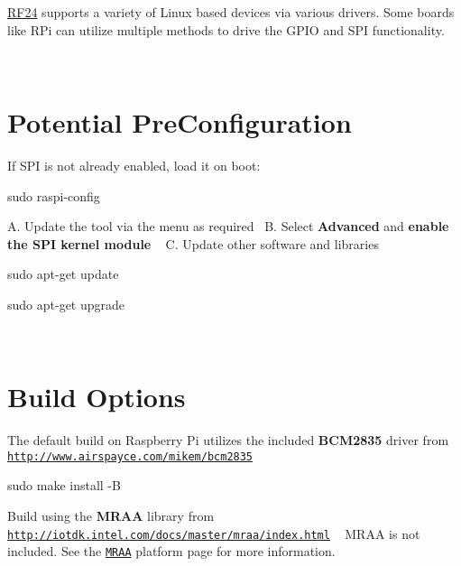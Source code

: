 \hyperlink{classRF24}{R\+F24} supports a variety of Linux based devices via various drivers. Some boards like R\+Pi can utilize multiple methods to drive the G\+P\+IO and S\+PI functionality.

~\newline
 \hypertarget{RPi_PreConfig}{}\section{Potential Pre\+Configuration}\label{RPi_PreConfig}
If S\+PI is not already enabled, load it on boot\+: 
\begin{DoxyCode}
sudo raspi-config  
\end{DoxyCode}
 A. Update the tool via the menu as required~\newline
 B. Select {\bfseries Advanced} and {\bfseries enable the S\+PI kernel module} ~\newline
 C. Update other software and libraries 
\begin{DoxyCode}
sudo apt-\textcolor{keyword}{get} update 
\end{DoxyCode}
 
\begin{DoxyCode}
sudo apt-\textcolor{keyword}{get} upgrade 
\end{DoxyCode}
 ~\newline
~\newline
\hypertarget{RPi_Build}{}\section{Build Options}\label{RPi_Build}
The default build on Raspberry Pi utilizes the included {\bfseries B\+C\+M2835} driver from \href{http://www.airspayce.com/mikem/bcm2835}{\tt http\+://www.\+airspayce.\+com/mikem/bcm2835}
\begin{DoxyEnumerate}
\item 
\begin{DoxyCode}
sudo make install -B 
\end{DoxyCode}

\end{DoxyEnumerate}

Build using the {\bfseries M\+R\+AA} library from \href{http://iotdk.intel.com/docs/master/mraa/index.html}{\tt http\+://iotdk.\+intel.\+com/docs/master/mraa/index.\+html} ~\newline
 M\+R\+AA is not included. See the \href{MRAA.html}{\tt M\+R\+AA} platform page for more information.


